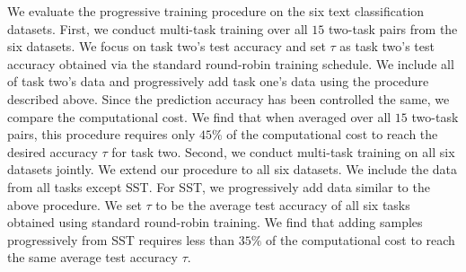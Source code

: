 We evaluate the progressive training procedure on the six text classification datasets.
First, we conduct multi-task training over all $15$ two-task pairs from the six datasets.
We focus on task two's test accuracy and set $\tau$ as task two's test accuracy obtained via the standard round-robin training schedule.
We include all of task two's data and progressively add task one's data using the procedure described above.
Since the prediction accuracy has been controlled the same, we compare the computational cost.
We find that when averaged over all $15$ two-task pairs, this procedure requires only $45\%$ of the computational cost to reach the desired accuracy $\tau$ for task two.
Second, we conduct multi-task training on all six datasets jointly.
We extend our procedure to all six datasets. We include the data from all tasks except SST. For SST, we progressively add data similar to the above procedure.
We set $\tau$ to be the average test accuracy of all six tasks obtained using standard round-robin training.
We find that adding samples progressively from SST requires less than $35\%$ of the computational cost to reach the same average test accuracy $\tau$.



